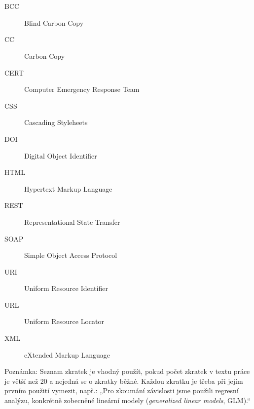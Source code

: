 \chapter*{\SeznamZkratek}

\begin{multicols}{2}
\raggedright
\begin{description}
\item [BCC] Blind Carbon Copy
\item [CC] Carbon Copy
\item [CERT] Computer Emergency Response Team
\item [CSS] Cascading Styleheets
\item [DOI] Digital Object Identifier
\item [HTML] Hypertext Markup Language
\item [REST] Representational State Transfer
\item [SOAP] Simple Object Access Protocol
\item [URI] Uniform Resource Identifier
\item [URL] Uniform Resource Locator
\item [XML] eXtended Markup Language
\end{description}
\end{multicols}

Poznámka: Seznam zkratek je vhodný použít, pokud počet zkratek v textu práce je větší než 20 a nejedná se o zkratky běžné. Každou zkratku je třeba při jejím prvním použití vymezit, např.: „Pro zkoumání závislosti jsme použili regresní analýzu, konkrétně zobecněné lineární modely (\emph{generalized linear models}, GLM).“